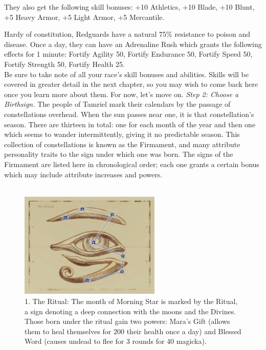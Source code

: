 \documentclass[12pt]{article}
\begin{document}
They also get the following skill bonuses: +10 Athletics, +10 Blade, +10 Blunt, +5 Heavy Armor, +5 Light Armor, +5 Mercantile.

Hardy of constitution, Redguards have a natural 75\% resistance to poison and disease. Once a day, they can have an Adrenaline Rush which grants the following effects for 1 minute: Fortify Agility 50, Fortify Endurance 50, Fortify Speed 50, Fortify Strength 50, Fortify Health 25.\\

Be sure to take note of all your race's skill bonuses and abilities. Skills will be covered in greater detail in the next chapter, so you may wish to come back here once you learn more about them. For now, let's move on.
\newpage
\textit{Step 2: Choose a Birthsign.}
The people of Tamriel mark their calendars by the passage of constellations overhead. When the sun passes near one, it is that constellation's season. There are thirteen in total: one for each month of the year and then one which seems to wander intermittently, giving it no predictable season. This collection of constellations is known as the Firmament, and many attribute personality traits to the sign under which one was born. The signs of the Firmament are listed here in chronological order; each one grants a certain bonus which may include attribute increases and powers.\\~\\

\begin{figure}[H]
\includegraphics[width=0.6\textwidth]{Ritual.png}
\centering
\caption*{1. The Ritual: The month of Morning Star is marked by the Ritual, a sign denoting a deep connection with the moons and the Divines. Those born under the ritual gain two powers: Mara's Gift (allows them to heal themselves for 200 their health once a day) and Blessed Word (causes undead to flee for 3 rounds for 40 magicka).}
\end{figure}
\end{document}
